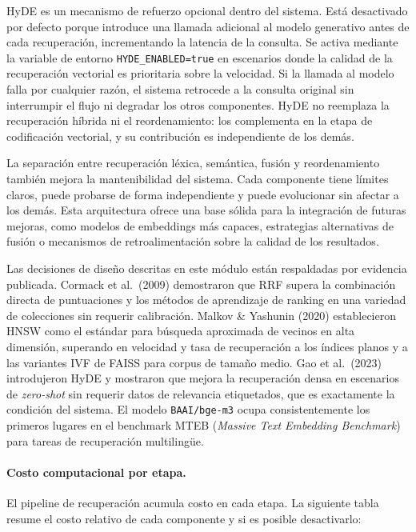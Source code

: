 \documentclass[11pt]{article}
\begin{document}
HyDE es un mecanismo de refuerzo opcional dentro del sistema. Está desactivado por defecto
porque introduce una llamada adicional al modelo generativo antes de cada recuperación,
incrementando la latencia de la consulta. Se activa mediante la variable de entorno
\texttt{HYDE\_ENABLED=true} en escenarios donde la calidad de la recuperación vectorial es
prioritaria sobre la velocidad. Si la llamada al modelo falla por cualquier razón, el sistema
retrocede a la consulta original sin interrumpir el flujo ni degradar los otros componentes.
HyDE no reemplaza la recuperación híbrida ni el reordenamiento: los complementa en la etapa de
codificación vectorial, y su contribución es independiente de los demás.

La separación entre recuperación léxica, semántica, fusión y reordenamiento también mejora la
mantenibilidad del sistema. Cada componente tiene límites claros, puede probarse de forma
independiente y puede evolucionar sin afectar a los demás. Esta arquitectura ofrece una base
sólida para la integración de futuras mejoras, como modelos de embeddings más capaces,
estrategias alternativas de fusión o mecanismos de retroalimentación sobre la calidad de los
resultados.

Las decisiones de diseño descritas en este módulo están respaldadas por evidencia publicada.
Cormack et al.\ (2009) demostraron que RRF supera la combinación directa de puntuaciones y los
métodos de aprendizaje de ranking en una variedad de colecciones sin requerir calibración.
Malkov \& Yashunin (2020) establecieron HNSW como el estándar para búsqueda aproximada de
vecinos en alta dimensión, superando en velocidad y tasa de recuperación a los índices planos
y a las variantes IVF de FAISS para corpus de tamaño medio. Gao et al.\ (2023) introdujeron
HyDE y mostraron que mejora la recuperación densa en escenarios de \emph{zero-shot} sin
requerir datos de relevancia etiquetados, que es exactamente la condición del sistema. El
modelo \texttt{BAAI/bge-m3} ocupa consistentemente los primeros lugares en el benchmark MTEB
(\emph{Massive Text Embedding Benchmark}) para tareas de recuperación multilingüe.

\paragraph{Costo computacional por etapa.}
El pipeline de recuperación acumula costo en cada etapa. La siguiente tabla resume el costo
relativo de cada componente y si es posible desactivarlo:
\end{document}
